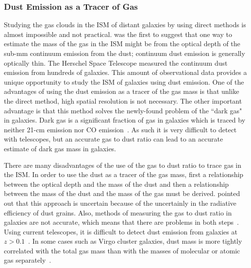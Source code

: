\subsubsection{Dust Emission as a Tracer of Gas} 

Studying the gas clouds in the ISM of distant galaxies by using direct methods is almost impossible and not practical. %
\cite{Hildebran83} was the first to suggest that one way to estimate the mass of the gas in the ISM might be from the optical depth of the sub-mm continuum emission from the dust; continuum dust emission is generally optically thin. 
The Herschel Space Telescope \cite{Pilbratt10} measured the continuum dust emission from hundreds of galaxies\citep{Eales10, Oliver12}. 
This amount of observational data provides a unique opportunity to study the ISM of galaxies using dust emission. 
One of the advantages of using the dust emission as a tracer of the gas mass is that unlike the direct method, high spatial resolution is not necessary. %
The other important advantage is that this method solves the newly-found problem of the ``dark gas" in galaxies. 
Dark gas is a significant fraction of gas in galaxies which is traced by neither 21-cm emission nor CO emission~\citep{Abdo10}. 
As such it is very difficult to detect with telescopes, but an accurate gas to dust ratio can lead to an accurate estimate of dark gas mass in galaxies. 

There are many disadvantages of the use of the gas to dust ratio to trace gas in the ISM.
In order to use the dust as a tracer of the gas mass, first a relationship between the optical depth and the mass of the dust and then a relationship between the mass of the dust and the mass of the gas must be derived. \cite{Draine03} pointed out that this approach is uncertain because of the uncertainly in the radiative efficiency of dust grains. 
Also, methods of measuring the gas to dust ratio in galaxies are not accurate, which means that there are problems in both steps~\citep{Hildebran83}. 
Using current telescopes, it is difficult to detect dust emission from galaxies at $z > 0.1$~\citep{Ealas12}. %
In some cases such as Virgo cluster galaxies, dust mass is more tightly correlated with the total gas mass than with the masses of molecular or atomic gas separately~\citep{Corbelli11}. %

